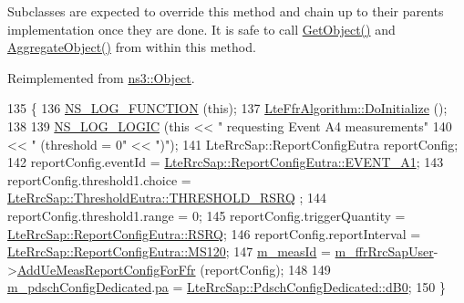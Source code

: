 Subclasses are expected to override this method and chain up to their parent\textquotesingle{}s implementation once they are done. It is safe to call \hyperlink{classns3_1_1Object_a13e18c00017096c8381eb651d5bd0783}{Get\+Object()} and \hyperlink{classns3_1_1Object_a79dd435d300f3deca814553f561a2922}{Aggregate\+Object()} from within this method. 

Reimplemented from \hyperlink{classns3_1_1Object_af8482a521433409fb5c7f749398c9dbe}{ns3\+::\+Object}.


\begin{DoxyCode}
135 \{
136   \hyperlink{log-macros-disabled_8h_a90b90d5bad1f39cb1b64923ea94c0761}{NS\_LOG\_FUNCTION} (\textcolor{keyword}{this});
137   \hyperlink{classns3_1_1Object_af8482a521433409fb5c7f749398c9dbe}{LteFfrAlgorithm::DoInitialize} ();
138 
139   \hyperlink{group__logging_ga88acd260151caf2db9c0fc84997f45ce}{NS\_LOG\_LOGIC} (\textcolor{keyword}{this} << \textcolor{stringliteral}{" requesting Event A4 measurements"}
140                      << \textcolor{stringliteral}{" (threshold = 0"} << \textcolor{stringliteral}{")"});
141   LteRrcSap::ReportConfigEutra reportConfig;
142   reportConfig.eventId = \hyperlink{structns3_1_1LteRrcSap_1_1ReportConfigEutra_ab8152dc095987f60bee2e9115046902fa9c0b835cb85601f8a9e424fbf0afab4b}{LteRrcSap::ReportConfigEutra::EVENT\_A1};
143   reportConfig.threshold1.choice = \hyperlink{structns3_1_1LteRrcSap_1_1ThresholdEutra_ad3ed2704b836132980dd2e97cb03822ca6e8bda2b99825f09f53388c29b6402b4}{LteRrcSap::ThresholdEutra::THRESHOLD\_RSRQ}
      ;
144   reportConfig.threshold1.range = 0;
145   reportConfig.triggerQuantity = \hyperlink{structns3_1_1LteRrcSap_1_1ReportConfigEutra_a82343ddf526faba0483431ea5882a3efaa4e09cb3c7154d7ab732115a2647325f}{LteRrcSap::ReportConfigEutra::RSRQ};
146   reportConfig.reportInterval = \hyperlink{structns3_1_1LteRrcSap_1_1ReportConfigEutra_aa04b2781a844eb212d59762829e41d31a589e66031e6df344b9cf90c323650e3a}{LteRrcSap::ReportConfigEutra::MS120};
147   \hyperlink{classns3_1_1LteFfrSimple_a267dc9ca96606efcbf61e5f26a8403f7}{m\_measId} = \hyperlink{classns3_1_1LteFfrSimple_a7aa41ba9d4983c0d765b4f4f6e1f5a15}{m\_ffrRrcSapUser}->\hyperlink{classns3_1_1LteFfrRrcSapUser_aa08ae169750b394f48a8d345ca9a0e7a}{AddUeMeasReportConfigForFfr}
       (reportConfig);
148 
149   \hyperlink{classns3_1_1LteFfrSimple_a05c1fbffbe85e713bb7047330087f3ba}{m\_pdschConfigDedicated}.\hyperlink{structns3_1_1LteRrcSap_1_1PdschConfigDedicated_aa9b1574a63fb83c53649305ca95aeb31}{pa} = 
      \hyperlink{structns3_1_1LteRrcSap_1_1PdschConfigDedicated_ab578fcb68059ff534058eb5c67df7168ab2c88638c7d33e466151e88100a930d6}{LteRrcSap::PdschConfigDedicated::dB0};
150 \}
\end{DoxyCode}


